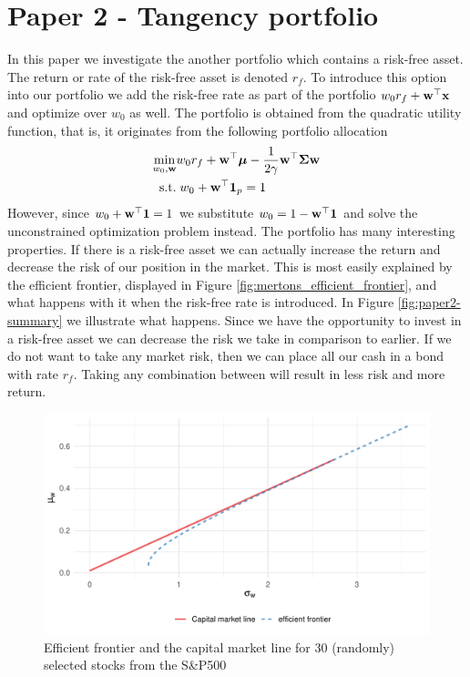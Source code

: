 \documentclass[]{book}\usepackage{knitr}
\begin{document}
\section*{Paper 2 - Tangency portfolio}
In this paper we investigate the another portfolio which contains a risk-free asset. The return or rate of the risk-free asset is denoted $r_f$. To introduce this option into our portfolio we add the risk-free rate as part of the portfolio $w_0 r_f + \mathbf{w}^\top \mathbf{x}$ and optimize over $w_0$ as well. The portfolio is obtained from the quadratic utility function, that is, it originates from the following portfolio allocation 
\begin{align}
  \min_{w_0,\mathbf{w}} & w_0 r_f + \mathbf{w}^\top \mbox{\boldmath$\mu$} - \frac{1}{2\gamma} \mathbf{w}^\top \mathbf{\Sigma} \mathbf{w} \\
  \text{ s.t.} &\; w_0 + \mathbf{w}^\top \mathbf{1}_p = 1
\end{align}
However, since $w_0 + \mathbf{w}^\top \mathbf{1}=1$ we substitute $w_0=1-\mathbf{w}^\top \mathbf{1}$ and solve the unconstrained optimization problem instead. The portfolio has many interesting properties. If there is a risk-free asset we can actually increase the return and decrease the risk of our position in the market. This is most easily explained by the efficient frontier, displayed in Figure \ref{fig:mertons_efficient_frontier}, and what happens with it when the risk-free rate is introduced. In Figure \ref{fig:paper2-summary} we illustrate what happens. Since we have the opportunity to invest in a risk-free asset we can decrease the risk we take in comparison to earlier. If we do not want to take any market risk, then we can place all our cash in a bond with rate $r_f$. Taking any combination between will result in less risk and more return.  
\begin{knitrout}
\color{fgcolor}\begin{figure}

{\centering \includegraphics[width=\maxwidth]{figure/paper2summary-1} 

}

\caption[Efficient frontier and the capital market line for 30 (randomly) selected stocks from the S\&P500]{Efficient frontier and the capital market line for 30 (randomly) selected stocks from the S\&P500}\label{fig:paper2summary}
\end{figure}

\end{knitrout}
\end{document}
